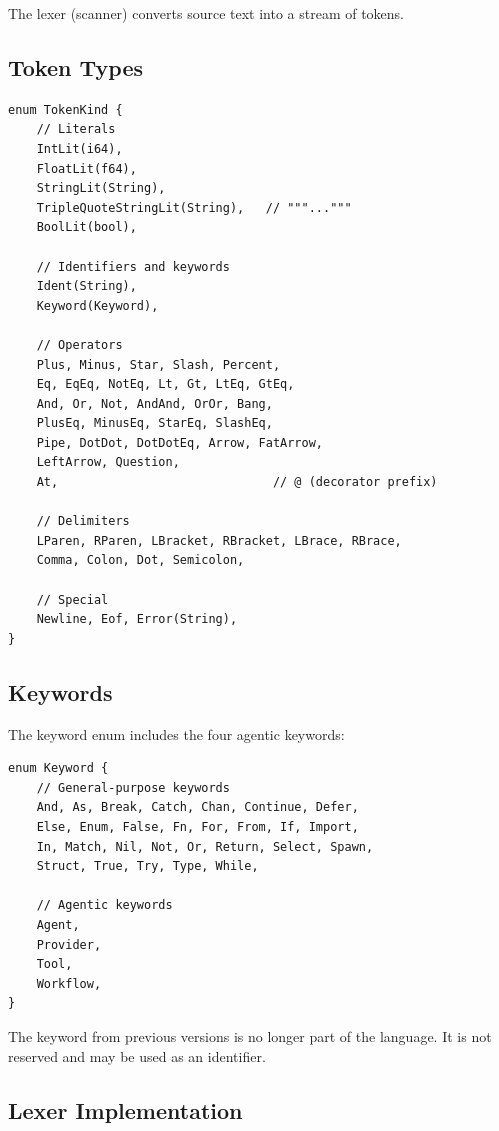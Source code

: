 The lexer (scanner) converts source text into a stream of tokens.

\subsection{Token Types}

\begin{lstlisting}[language={}]
enum TokenKind {
    // Literals
    IntLit(i64),
    FloatLit(f64),
    StringLit(String),
    TripleQuoteStringLit(String),   // """..."""
    BoolLit(bool),

    // Identifiers and keywords
    Ident(String),
    Keyword(Keyword),

    // Operators
    Plus, Minus, Star, Slash, Percent,
    Eq, EqEq, NotEq, Lt, Gt, LtEq, GtEq,
    And, Or, Not, AndAnd, OrOr, Bang,
    PlusEq, MinusEq, StarEq, SlashEq,
    Pipe, DotDot, DotDotEq, Arrow, FatArrow,
    LeftArrow, Question,
    At,                              // @ (decorator prefix)

    // Delimiters
    LParen, RParen, LBracket, RBracket, LBrace, RBrace,
    Comma, Colon, Dot, Semicolon,

    // Special
    Newline, Eof, Error(String),
}
\end{lstlisting}

\subsection{Keywords}

The keyword enum includes the four agentic keywords:

\begin{lstlisting}[language={}]
enum Keyword {
    // General-purpose keywords
    And, As, Break, Catch, Chan, Continue, Defer,
    Else, Enum, False, Fn, For, From, If, Import,
    In, Match, Nil, Not, Or, Return, Select, Spawn,
    Struct, True, Try, Type, While,

    // Agentic keywords
    Agent,
    Provider,
    Tool,
    Workflow,
}
\end{lstlisting}

\begin{note}
The  keyword from previous versions is no longer part of the language. It is not reserved and may be used as an identifier.
\end{note}

\subsection{Lexer Implementation}

